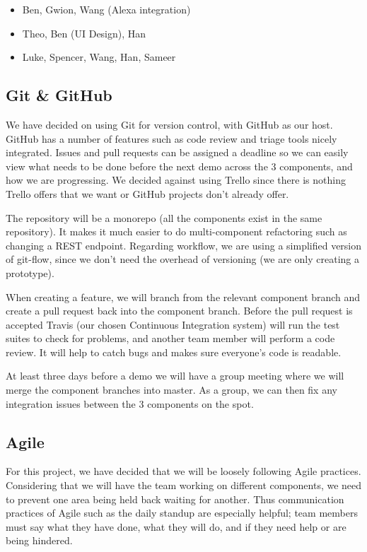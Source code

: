 \documentclass[onecolumn]{IEEEtran}
\begin{document}
\begin{itemize}
    \item Ben, Gwion, Wang (Alexa integration)
    \item Theo, Ben (UI Design), Han
    \item Luke, Spencer, Wang, Han, Sameer
\end{itemize}

\subsection{Git \& GitHub}

We have decided on using Git for version control, with GitHub as our host. GitHub has a number of features such as code review and triage tools nicely integrated. Issues and pull requests can be assigned a deadline so we can easily view what needs to be done before the next demo across the 3 components, and how we are progressing. We decided against using Trello since there is nothing Trello offers that we want or GitHub projects don’t already offer.

The repository will be a monorepo (all the components exist in the same repository). It makes it much easier to do multi-component refactoring such as changing a REST endpoint. Regarding workflow, we are using a simplified version of git-flow, since we don’t need the overhead of versioning (we are only creating a prototype).

When creating a feature, we will branch from the relevant component branch and create a pull request back into the component branch. Before the pull request is accepted Travis (our chosen Continuous Integration system) will run the test suites to check for problems, and another team member will perform a code review. It will help to catch bugs and makes sure everyone's code is readable.

At least three days before a demo we will have a group meeting where we will merge the component branches into master. As a group, we can then fix any integration issues between the 3 components on the spot.

\subsection{Agile}

For this project, we have decided that we will be loosely following Agile practices. Considering that we will have the team working on different components, we need to prevent one area being held back waiting for another. Thus communication practices of Agile such as the daily standup are especially helpful; team members must say what they have done, what they will do, and if they need help or are being hindered. 
\end{document}
